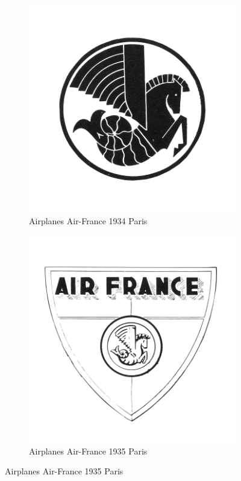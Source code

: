 \begin{figure}[h]
  \begin{subfigure}{.45\textwidth}
    \centering
    \includegraphics[width=.5\linewidth]{images/supplement/trademarks/french/4_16}
    \caption{Airplanes Air-France 1934 Paris}
    \label{fig:trademarks:french:4.16}
  \end{subfigure}\hfill
  \begin{subfigure}{.45\textwidth}
    \centering
    \includegraphics[width=.5\linewidth]{images/supplement/trademarks/french/4_17}
    \caption{Airplanes Air-France 1935 Paris}
    \label{fig:trademarks:french:4.17}
  \end{subfigure}


\end{figure}
